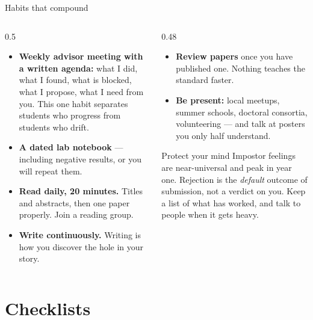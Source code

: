 \documentclass[aspectratio=169,11pt]{beamer}
\newcommand{\key}[1]{\textbf{\color{brand}#1}}
\begin{document}
\begin{frame}{Habits that compound}
\begin{columns}[T]
\begin{column}{0.5\textwidth}
\footnotesize
\begin{itemize}
  \item \key{Weekly advisor meeting with a written agenda:} what I did, what I
        found, what is blocked, what I propose, what I need from you. This one
        habit separates students who progress from students who drift.
  \item \key{A dated lab notebook} --- including negative results, or you will
        repeat them.
  \item \key{Read daily, 20 minutes.} Titles and abstracts, then one paper
        properly. Join a reading group.
  \item \key{Write continuously.} Writing is how you discover the hole in your
        story.
\end{itemize}
\end{column}
\begin{column}{0.48\textwidth}
\footnotesize
\begin{itemize}
  \item \key{Review papers} once you have published one. Nothing teaches the
        standard faster.
  \item \key{Be present:} local meetups, summer schools, doctoral consortia,
        volunteering --- and talk at posters you only half understand.
\end{itemize}
\medskip
\begin{alertblock}{Protect your mind}
\footnotesize
Impostor feelings are near-universal and peak in year one. Rejection is the
\emph{default} outcome of submission, not a verdict on you. Keep a list of what
has worked, and talk to people when it gets heavy.
\end{alertblock}
\end{column}
\end{columns}
\end{frame}

\section{Checklists}
\end{document}
